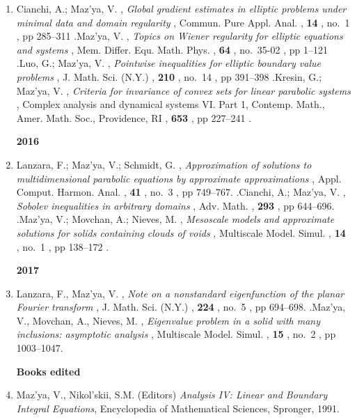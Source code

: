 \documentclass{article}
\newcommand{\authors}[1]{\item #1\ignorespaces}
\renewcommand{\title}[1]{, \textit{#1}\ignorespaces}
\newcommand{\journal}[1]{, {#1}\ignorespaces}
\newcommand{\volume}[1]{, \textbf{#1}\ignorespaces}
\newcommand{\no}[1]{, no.~{#1}\ignorespaces}
\newcommand{\pages}[1]{, pp #1\ignorespaces}
\newcommand{\jitem}[1]{.}
\begin{document}
\begin{enumerate}
\authors{Cianchi, A.; Maz'ya, V.}
\title{Global gradient estimates in elliptic problems under minimal data and domain regularity}
\journal{Commun. Pure Appl. Anal.}
\volume{14}
\no{1}
\pages{285--311}
\jitem

\authors{Maz'ya, V.}
\title{Topics on Wiener regularity for elliptic equations and systems}
\journal{Mem. Differ. Equ. Math. Phys.}
\volume{64}
\no{35-02}
\pages{1--121}
\jitem

\authors{Luo, G.; Maz'ya, V.}
\title{Pointwise inequalities for elliptic boundary value problems}
\journal{ J. Math. Sci. (N.Y.)}
\volume{210}
\no{14}
\pages{391--398}
\jitem

\authors{Kresin, G.; Maz'ya, V.}
\title{Criteria for invariance of convex sets for linear parabolic systems}
\journal{Complex analysis and dynamical systems VI. Part 1, Contemp. Math., Amer. Math. Soc., Providence, RI}
\volume{653}
\pages{227--241}
\jitem

\medskip

{\bf 2016}


\authors{Lanzara, F.; Maz'ya, V.; Schmidt, G.}
\title{Approximation of solutions to multidimensional parabolic equations by
approximate approximations}
\journal{Appl. Comput. Harmon. Anal.}
\volume{41}
\no{3}
\pages{749--767}.
\jitem

\authors{Cianchi, A.; Maz'ya, V.}
\title{Sobolev inequalities in arbitrary domains}
\journal{Adv. Math.}
\volume{293}
\pages{644--696}.
\jitem

\authors{Maz'ya, V.; Movchan, A.; Nieves, M.}
\title{Mesoscale models and approximate solutions for solids containing clouds of voids}
\journal{ Multiscale Model. Simul.}
\volume{14}
\no{1}
\pages{138--172}
\jitem


\medskip

{\bf 2017}

\authors{Lanzara, F., Maz'ya, V.}
\title{Note on a nonstandard eigenfunction of the planar Fourier transform}
\journal{J. Math. Sci. (N.Y.)}
\volume{224}
\no{5}
\pages{694--698}.
\jitem

\authors{Maz'ya, V., Movchan, A., Nieves, M.}
\title{Eigenvalue problem in a solid with many inclusions: asymptotic analysis}
\journal{Multiscale Model. Simul.}
\volume{15}
\no{2}
\pages{1003--1047}.


\bigskip

\textbf{\large Books edited}

\item Maz'ya, V., Nikol'skii, S.M. (Editors) {\it Analysis IV: Linear and Boundary Integral Equations}, Encyclopedia of Mathematical Sciences, Spronger, 1991.


\end{enumerate}
\end{document}
